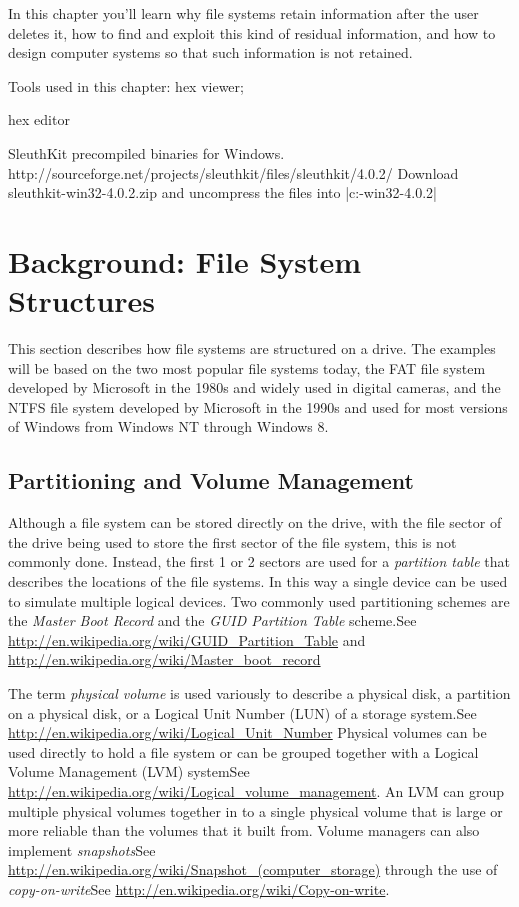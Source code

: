 \documentclass[11pt,letter]{book}
\newcommand{\wikipedia}[1]{See \url{#1}}
\newcommand{\wikipediab}[1]{ and \url{#1}}
\begin{document}
In this chapter you'll learn why file systems retain information after the
user deletes it, how to find and exploit this kind of residual
information, and how to design computer systems so that such
information is not retained.

Tools used in this chapter: hex viewer;

hex editor

SleuthKit precompiled binaries for
Windows. http://sourceforge.net/projects/sleuthkit/files/sleuthkit/4.0.2/
  Download sleuthkit-win32-4.0.2.zip and uncompress the files into
  |c:\sleuthkit-win32-4.0.2|



\section{Background: File System Structures}
This section describes how file systems are structured on a drive. The
examples will be based on the two most popular file systems today, the
FAT file system developed by Microsoft in the 1980s and widely used in
digital cameras, and the NTFS file system developed by Microsoft in
the 1990s and used for most versions of Windows from Windows NT
through Windows 8.


\subsection{Partitioning and Volume Management}

Although a file system can be stored directly on the drive, with the
file sector of the drive being used to store the first sector of the
file system, this is not commonly done. Instead, the first 1 or 2
sectors are used for a \emph{partition table} that describes the
locations of the file systems. In this way a single device can be used
to simulate multiple logical devices. Two commonly used partitioning
schemes are the \emph{Master Boot Record} and the \emph{GUID Partition
  Table} scheme.\wikipedia{http://en.wikipedia.org/wiki/GUID_Partition_Table}
       \wikipediab{http://en.wikipedia.org/wiki/Master_boot_record}

The term \emph{physical volume} is used variously to describe a
physical disk, a partition on a physical disk, or a Logical Unit
Number (LUN) of a storage
system.\wikipedia{http://en.wikipedia.org/wiki/Logical_Unit_Number}
Physical volumes can be used directly to hold a file system or can be
grouped together with a Logical Volume Management (LVM)
system\wikipedia{http://en.wikipedia.org/wiki/Logical_volume_management}. An
LVM can group multiple physical volumes together in to a single
physical volume that is large or more reliable than the volumes that
it built from. Volume managers can also implement
\emph{snapshots}\wikipedia{http://en.wikipedia.org/wiki/Snapshot_(computer_storage)}
through the use of
\emph{copy-on-write}\wikipedia{http://en.wikipedia.org/wiki/Copy-on-write}.
\end{document}
